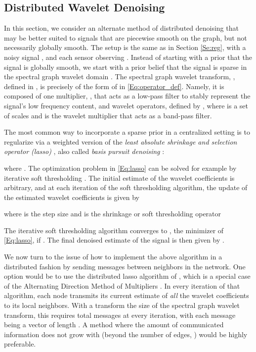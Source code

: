 \documentclass[conference]{IEEEtran}
\begin{document}
\subsection{Distributed Wavelet Denoising}\label{Se:denoising}
In this section, we consider an alternate method of distributed denoising that may be better suited to signals that are piecewise smooth on the graph, but not necessarily globally smooth. The setup is the same as in Section \ref{Se:reg}, with a noisy signal ,
and each sensor  observing . Instead of starting with a prior that the signal is globally smooth, we start with a prior belief that the signal is sparse in the spectral graph wavelet domain \cite{LTS-ARTICLE-2009-053}.
The spectral graph wavelet transform, , defined in \cite{LTS-ARTICLE-2009-053}, is precisely of the form of  in \eqref{Eq:operator_def}. Namely, it is composed of one multiplier, , that acts as a low-pass filter to stably represent the signal's low frequency content, and  wavelet operators, defined by , where  is a set of scales and  is the wavelet multiplier that acts as a band-pass filter.

The most common way to incorporate a sparse prior in a centralized setting is to regularize via a weighted version of the \emph{least absolute shrinkage and selection operator (lasso)} \cite{lasso}, also called \emph{basis pursuit denoising} \cite{basispursuit}:

where
.
The optimization problem in \eqref{Eq:lasso} can be solved for example by iterative soft thresholding \cite{DDD}. The initial estimate of the wavelet coefficients  is arbitrary, and at each iteration of the soft thresholding algorithm, the update of the estimated wavelet coefficients is given by

where  is the step size and  is the shrinkage or soft thresholding operator

The iterative soft thresholding algorithm converges to , the minimizer of \eqref{Eq:lasso}, if  \cite{combettes}. The final denoised estimate of the signal is then given by .

We now turn to the issue of how to implement the above algorithm in a distributed fashion by sending messages between neighbors in the network. One option would be to use the distributed lasso algorithm of \cite{dlasso}, which is a special case of the Alternating Direction Method of Multipliers \cite[p.~253]{par_dist_opt_book}. In every iteration of that algorithm, each node transmits its current estimate of \emph{all} the wavelet coefficients to its local neighbors. With a transform the size of the spectral graph wavelet transform, this requires  total messages at every iteration, with each message being a vector of length  .
A method where the amount of communicated information does not grow with  (beyond the number of edges, ) would be highly preferable.
\end{document}
